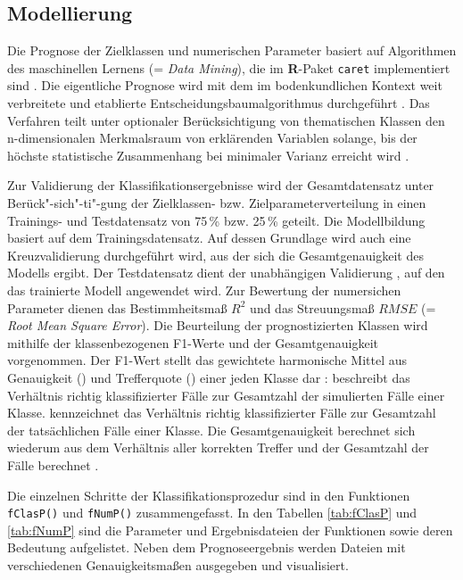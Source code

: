 \subsection{Modellierung}
Die Prognose der Zielklassen und numerischen Parameter basiert auf Algorithmen des maschinellen Lernens (= \textit{Data Mining}), die im \textbf{R}-Paket \texttt{caret} implementiert sind \citep{Kuhn2008jss,KuhnJohnson2013apm}. Die eigentliche Prognose wird mit dem im bodenkundlichen Kontext weit verbreitete und etablierte Entscheidungsbaumalgorithmus  durchgeführt \citep{Behrens-etal2018sr,Taghizadeh-Mehrjardi-etal2020}. Das Verfahren teilt unter optionaler Berücksichtigung von thematischen Klassen den n-dimensionalen Merkmalsraum von erklärenden Variablen solange, bis der höchste statistische Zusammenhang bei minimaler Varianz erreicht wird \citep{Breiman2001,LiawWiener2002}.\

Zur Validierung der Klassifikationsergebnisse wird der Gesamtdatensatz unter Berück"-sich"-ti"-gung der Zielklassen- bzw. Zielparameterverteilung in einen Trainings- und Testdatensatz von 75\,\% bzw. 25\,\% geteilt. Die Modellbildung basiert auf dem Trainingsdatensatz. Auf dessen Grundlage wird auch eine Kreuzvalidierung durchgeführt wird, aus der sich die Gesamtgenauigkeit des Modells ergibt. Der Testdatensatz dient der unabhängigen Validierung \citep{KhaledianMiller2020amm}, auf den das trainierte Modell angewendet wird. Zur Bewertung der numersichen Parameter dienen das Bestimmheitsmaß $R^2$ und das Streuungsmaß $RMSE$ (= \textit{Root Mean Square Error}). Die Beurteilung der prognostizierten Klassen wird mithilfe der klassenbezogenen F1-Werte und der Gesamtgenauigkeit vorgenommen. Der F1-Wert stellt das gewichtete harmonische Mittel aus Genauigkeit () und Trefferquote () einer jeden Klasse dar \citep{Manning-etal2008}:  beschreibt das Verhältnis richtig klassifizierter Fälle zur Gesamtzahl der simulierten Fälle einer Klasse.   kennzeichnet das Verhältnis richtig klassifizierter Fälle zur Gesamtzahl der tatsächlichen Fälle einer Klasse. Die Gesamtgenauigkeit berechnet sich wiederum aus dem Verhältnis aller korrekten Treffer und der Gesamtzahl der Fälle berechnet \citep{Stehmann1997rse}.\

Die einzelnen Schritte der Klassifikationsprozedur sind in den Funktionen \texttt{fClasP()} und  \texttt{fNumP()} zusammengefasst. In den Tabellen  \ref{tab:fClasP} und \ref{tab:fNumP} sind die Parameter und Ergebnisdateien der Funktionen sowie deren Bedeutung aufgelistet. Neben dem Prognoseergebnis werden Dateien mit verschiedenen Genauigkeitsmaßen ausgegeben und visualisiert.

